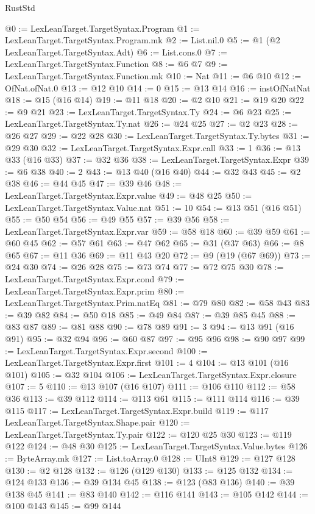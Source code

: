 \begin{lexlean}{RustStd}
\begin{coremodule}
{\begin{coremodule}
{{{{{{{{{{{@0 := LexLeanTarget.TargetSyntax.Program
@1 := LexLeanTarget.TargetSyntax.Program.mk
@2 := List.nil.{0}
@5 := @1 (@2 LexLeanTarget.TargetSyntax.Adt)
@6 := List.cons.{0}
@7 := LexLeanTarget.TargetSyntax.Function
@8 := @6 @7
@9 := LexLeanTarget.TargetSyntax.Function.mk
@10 := Nat
@11 := @6 @10
@12 := OfNat.ofNat.{0}
@13 := @12 @10
@14 := 0
@15 := @13 @14
@16 := instOfNatNat
@18 := @15 (@16 @14)
@19 := @11 @18
@20 := @2 @10
@21 := @19 @20
@22 := @9 @21
@23 := LexLeanTarget.TargetSyntax.Ty
@24 := @6 @23
@25 := LexLeanTarget.TargetSyntax.Ty.nat
@26 := @24 @25
@27 := @2 @23
@28 := @26 @27
@29 := @22 @28
@30 := LexLeanTarget.TargetSyntax.Ty.bytes
@31 := @29 @30
@32 := LexLeanTarget.TargetSyntax.Expr.call
@33 := 1
@36 := @13 @33 (@16 @33)
@37 := @32 @36
@38 := LexLeanTarget.TargetSyntax.Expr
@39 := @6 @38
@40 := 2
@43 := @13 @40 (@16 @40)
@44 := @32 @43
@45 := @2 @38
@46 := @44 @45
@47 := @39 @46
@48 := LexLeanTarget.TargetSyntax.Expr.value
@49 := @48 @25
@50 := LexLeanTarget.TargetSyntax.Value.nat
@51 := 10
@54 := @13 @51 (@16 @51)
@55 := @50 @54
@56 := @49 @55
@57 := @39 @56
@58 := LexLeanTarget.TargetSyntax.Expr.var
@59 := @58 @18
@60 := @39 @59
@61 := @60 @45
@62 := @57 @61
@63 := @47 @62
@65 := @31 (@37 @63)
@66 := @8 @65
@67 := @11 @36
@69 := @11 @43 @20
@72 := @9 (@19 (@67 @69))
@73 := @24 @30
@74 := @26 @28
@75 := @73 @74
@77 := @72 @75 @30
@78 := LexLeanTarget.TargetSyntax.Expr.cond
@79 := LexLeanTarget.TargetSyntax.Expr.prim
@80 := LexLeanTarget.TargetSyntax.Prim.natEq
@81 := @79 @80
@82 := @58 @43
@83 := @39 @82
@84 := @50 @18
@85 := @49 @84
@87 := @39 @85 @45
@88 := @83 @87
@89 := @81 @88
@90 := @78 @89
@91 := 3
@94 := @13 @91 (@16 @91)
@95 := @32 @94
@96 := @60 @87
@97 := @95 @96
@98 := @90 @97
@99 := LexLeanTarget.TargetSyntax.Expr.second
@100 := LexLeanTarget.TargetSyntax.Expr.first
@101 := 4
@104 := @13 @101 (@16 @101)
@105 := @32 @104
@106 := LexLeanTarget.TargetSyntax.Expr.closure
@107 := 5
@110 := @13 @107 (@16 @107)
@111 := @106 @110
@112 := @58 @36
@113 := @39 @112
@114 := @113 @61
@115 := @111 @114
@116 := @39 @115
@117 := LexLeanTarget.TargetSyntax.Expr.build
@119 := @117 LexLeanTarget.TargetSyntax.Shape.pair
@120 := LexLeanTarget.TargetSyntax.Ty.pair
@122 := @120 @25 @30
@123 := @119 @122
@124 := @48 @30
@125 := LexLeanTarget.TargetSyntax.Value.bytes
@126 := ByteArray.mk
@127 := List.toArray.{0}
@128 := UInt8
@129 := @127 @128
@130 := @2 @128
@132 := @126 (@129 @130)
@133 := @125 @132
@134 := @124 @133
@136 := @39 @134 @45
@138 := @123 (@83 @136)
@140 := @39 @138 @45
@141 := @83 @140
@142 := @116 @141
@143 := @105 @142
@144 := @100 @143
@145 := @99 @144
}}}}}}}}}}}
\end{coremodule}}
\end{coremodule}
\end{lexlean}

